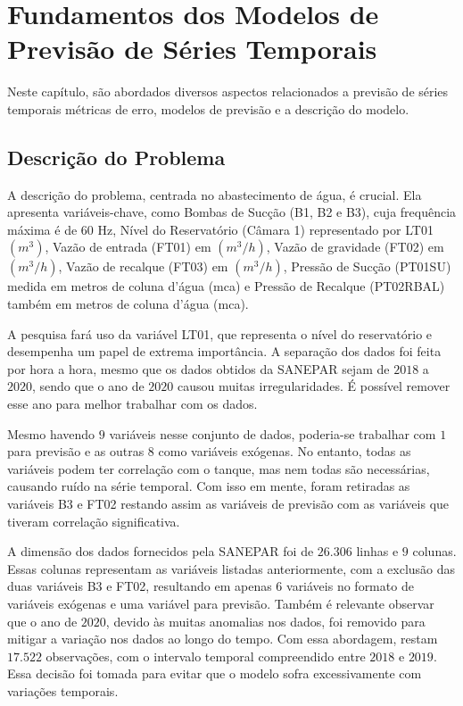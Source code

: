 \section{Fundamentos dos Modelos de Previs\~ao de S\'eries Temporais}\label{sec:base}

 Neste capítulo, são abordados diversos aspectos relacionados a previsão de séries temporais métricas de erro, modelos de previsão e a descrição do modelo. 
 
 \subsection{Descri\c c\~ao do Problema} \label{subsec:descricao}
 A descrição do problema, centrada no abastecimento de água, é crucial. Ela apresenta variáveis-chave, como Bombas de Sucção (B1, B2 e B3), cuja frequência máxima é de $60$ Hz, Nível do Reservatório (Câmara 1) representado por LT01 $(m^3)$, Vazão de entrada (FT01) em $(m^3/h)$, Vazão de gravidade (FT02) em $(m^3/h)$, Vazão de recalque (FT03) em $(m^3/h)$, Pressão de Sucção (PT01SU) medida em metros de coluna d'água (mca) e Pressão de Recalque (PT02RBAL) também em metros de coluna d'água (mca).
 
 A pesquisa fará uso da variável LT01, que representa o nível do reservatório e desempenha um papel de extrema importância. A separação dos dados foi feita por hora a hora, mesmo que os dados obtidos da SANEPAR sejam de $2018$ a $2020$, sendo que o ano de $2020$ causou muitas irregularidades. É possível remover esse ano para melhor trabalhar com os dados.
 
 Mesmo havendo $9$ variáveis nesse conjunto de dados, poderia-se trabalhar com $1$ para previsão e as outras $8$ como variáveis exógenas. No entanto, todas as variáveis podem ter correlação com o tanque, mas nem todas são necessárias, causando ruído na série temporal. Com isso em mente, foram retiradas as variáveis B3 e FT02 restando assim as variáveis de previsão com as variáveis que tiveram correlação significativa.
 
 A dimensão dos dados fornecidos pela SANEPAR foi de $26.306$ linhas e $9$ colunas. Essas colunas representam as variáveis listadas anteriormente, com a exclusão das duas variáveis B3 e FT02, resultando em apenas $6$ variáveis no formato de variáveis exógenas e uma variável para previsão. Também é relevante observar que o ano de $2020$, devido às muitas anomalias nos dados, foi removido para mitigar a variação nos dados ao longo do tempo. Com essa abordagem, restam $17.522$ observações, com o intervalo temporal compreendido entre $2018$ e $2019$. Essa decisão foi tomada para evitar que o modelo sofra excessivamente com variações temporais.
 

